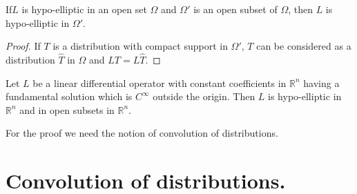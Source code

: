 \begin{coro*}
If\pageoriginale $L$ is hypo-elliptic in an open set $\Omega$ and $\Omega'$ is an open subset of $\Omega$, then $L$ is hypo-elliptic in $\Omega'$.
\end{coro*}

\begin{proof}
If $T$ is a distribution with compact support in $\Omega'$, $T$ can be considered as a distribution $\widehat{T}$ in $\Omega$ and $LT=L\widehat{T}$.
\end{proof}

\begin{theorem}\label{chap3-thm4}
Let $L$ be a linear differential operator with constant coefficients in $\mathbb{R}^{n}$ having a fundamental solution which is $C^{\infty}$ outside the origin. Then $L$ is hypo-elliptic in $\mathbb{R}^{n}$ and in open subsets in $\mathbb{R}^{n}$.
\end{theorem}

For the proof we need the notion of convolution of distributions.

\section*{Convolution of distributions.}

